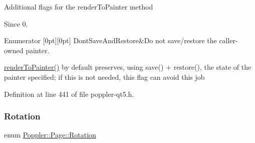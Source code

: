 Additional flags for the render\+To\+Painter method \begin{DoxySince}{Since}
0. 
\end{DoxySince}
\begin{DoxyEnumFields}{Enumerator}
[0pt][0pt]{}\mbox{\label{class_poppler_1_1_page_a7b9a4e7b8a2bb20b036e862c7409be6baf8d6975a6cf5a3809a4cd29d9959d9d1}} 
Dont\+Save\+And\+Restore&Do not save/restore the caller-\/owned painter.

\hyperlink{class_poppler_1_1_page_a006c33318200e2aad87022b43de6ad1f}{render\+To\+Painter()} by default preserves, using save() + restore(), the state of the painter specified; if this is not needed, this flag can avoid this job \\
\hline

\end{DoxyEnumFields}


Definition at line 441 of file poppler-\/qt5.\+h.

\mbox{\label{class_poppler_1_1_page_a9c9a4e1bc301cd2ab4eac0b51f0dc0ec}} 
\subsubsection{\texorpdfstring{Rotation}{Rotation}}
{\footnotesize\ttfamily enum \hyperlink{class_poppler_1_1_page_a9c9a4e1bc301cd2ab4eac0b51f0dc0ec}{Poppler\+::\+Page\+::\+Rotation}}


